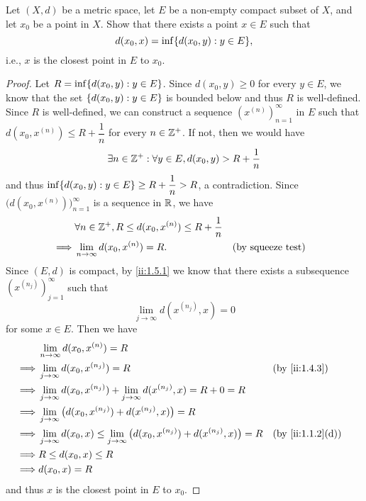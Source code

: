 \begin{ex}\label{ii:ex:1.5.14}
  Let \((X, d)\) be a metric space, let \(E\) be a non-empty compact subset of \(X\), and let \(x_0\) be a point in \(X\).
  Show that there exists a point \(x \in E\) such that
  \[
    d(x_0, x) = \inf\set{d(x_0, y) : y \in E},
  \]
  i.e., \(x\) is the closest point in \(E\) to \(x_0\).
\end{ex}

\begin{proof}
  Let \(R = \inf\set{d(x_0, y) : y \in E}\).
  Since \(d(x_0, y) \geq 0\) for every \(y \in E\), we know that the set \(\left\lbrace d(x_0, y) : y \in E\right\rbrace\) is bounded below and thus \(R\) is well-defined.
  Since \(R\) is well-defined, we can construct a sequence \((x^{(n)})_{n = 1}^\infty\) in \(E\) such that \(d(x_0, x^{(n)}) \leq R + \dfrac{1}{n}\) for every \(n \in \mathbb{Z}^+\).
  If not, then we would have
  \[
    \exists n \in \mathbb{Z}^+ : \forall y \in E, d(x_0, y) > R + \dfrac{1}{n}
  \]
  and thus \(\inf\set{d(x_0, y) : y \in E} \geq R + \dfrac{1}{n} > R\), a contradiction.
  Since \(\big(d(x_0, x^{(n)})\big)_{n = 1}^\infty\) is a sequence in \(\mathbb{R}\), we have
  \begin{align*}
             & \forall n \in \mathbb{Z}^+, R \leq d(x_0, x^{(n)}) \leq R + \dfrac{1}{n}                               \\
    \implies & \lim_{n \to \infty} d(x_0, x^{(n)}) = R.                         &  & \text{(by squeeze test)}
  \end{align*}
  Since \((E, d)\) is compact, by \cref{ii:1.5.1} we know that there exists a subsequence \((x^{(n_j)})_{j = 1}^\infty\) such that
  \[
    \lim_{j \to \infty} d(x^{(n_j)}, x) = 0
  \]
  for some \(x \in E\).
  Then we have
  \begin{align*}
             & \lim_{n \to \infty} d(x_0, x^{(n)}) = R                                                                                     \\
    \implies & \lim_{j \to \infty} d(x_0, x^{(n_j)}) = R                                                                &  & \by{ii:1.4.3}    \\
    \implies & \lim_{j \to \infty} d(x_0, x^{(n_j)}) + \lim_{j \to \infty} d(x^{(n_j)}, x) = R + 0 = R                                     \\
    \implies & \lim_{j \to \infty} \big(d(x_0, x^{(n_j)}) + d(x^{(n_j)}, x)\big) = R                                                       \\
    \implies & \lim_{j \to \infty} d(x_0, x) \leq \lim_{j \to \infty} \big(d(x_0, x^{(n_j)}) + d(x^{(n_j)}, x)\big) = R &  & \by{ii:1.1.2}[d] \\
    \implies & R \leq d(x_0, x) \leq R                                                                                                     \\
    \implies & d(x_0, x) = R
  \end{align*}
  and thus \(x\) is the closest point in \(E\) to \(x_0\).
\end{proof}

